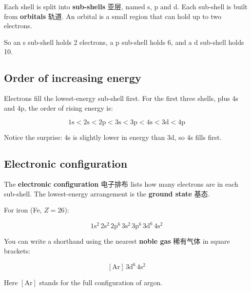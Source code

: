 \documentclass[11pt]{article}
\begin{document}
Each shell is split into \textbf{sub-shells} 亚层, named s, p and d. Each sub-shell is built from \textbf{orbitals} 轨道. An orbital is a small region that can hold up to two electrons.

\begin{center}
\end{center}

So an s sub-shell holds 2 electrons, a p sub-shell holds 6, and a d sub-shell holds 10.

\subsection*{Order of increasing energy}

Electrons fill the lowest-energy sub-shell first. For the first three shells, plus 4s and 4p, the order of rising energy is:

\[
1\text{s} < 2\text{s} < 2\text{p} < 3\text{s} < 3\text{p} < 4\text{s} < 3\text{d} < 4\text{p}
\]

Notice the surprise: 4s is slightly lower in energy than 3d, so 4s fills first.

\subsection*{Electronic configuration}

The \textbf{electronic configuration} 电子排布 lists how many electrons are in each sub-shell. The lowest-energy arrangement is the \textbf{ground state} 基态.

For iron (Fe, $Z = 26$):

\[
1\text{s}^2\,2\text{s}^2\,2\text{p}^6\,3\text{s}^2\,3\text{p}^6\,3\text{d}^6\,4\text{s}^2
\]

You can write a shorthand using the nearest \textbf{noble gas} 稀有气体 in square brackets:

\[
[\text{Ar}]\,3\text{d}^6\,4\text{s}^2
\]

Here $[\text{Ar}]$ stands for the full configuration of argon.
\end{document}

